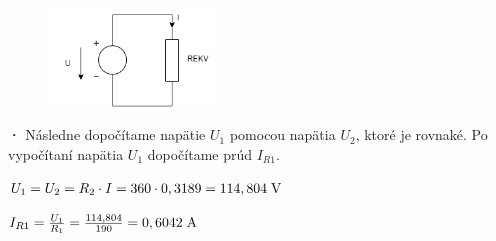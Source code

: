 \begin{figure}[h!]
    \centering
    \includegraphics[width=0.4\textwidth]{IEL-Project/pictures/Pr2_5.png}
\end{figure}

\textbf{·}
Následne dopočítame napätie $U_1$ pomocou napätia $U_2$, ktoré je rovnaké. Po vypočítaní napätia $U_1$  dopočítame prúd $I_{R1}$.

\begin{center}
    $U_1 = U_2 = R_2 \cdot I = 360 \cdot 0,3189 = {114,804} \hspace{0,1cm} \SI{}{\volt}$
\end{center}

\begin{center}
    $I_{R1} = \frac{U_1}{R_1} = \frac{114,804}{190} = {0,6042} \hspace{0,1cm} \SI{}{\ampere}$
\end{center}